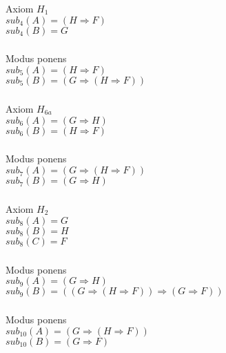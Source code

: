 \documentclass[10pt,a4paper,oneside,ngerman,numbers=noenddot]{scrartcl}
\begin{document}
\subsubsection{} %
Axiom $H_{1}$ \\
$sub_{4}(A) = (H \Rightarrow F)$\\
$sub_{4}(B) = G$
\subsubsection{} %
Modus ponens\\
$sub_{5}(A) = (H \Rightarrow F)$\\
$sub_{5}(B) = (G \Rightarrow (H \Rightarrow F))$
\subsubsection{} %
Axiom $H_{6a}$\\
$sub_{6}(A) = (G \Rightarrow H)$\\
$sub_{6}(B) = (H \Rightarrow F)$
\subsubsection{} %
Modus ponens\\
$sub_{7}(A) = (G \Rightarrow (H \Rightarrow F))$ \\
$sub_{7}(B) = (G \Rightarrow H)$
\subsubsection{} %
Axiom $H_{2}$\\
$sub_{8}(A) = G$\\
$sub_{8}(B) = H$\\
$sub_{8}(C) = F$
\subsubsection{} %
Modus ponens\\
$sub_{9}(A) = (G \Rightarrow H)$\\
$sub_{9}(B) = ((G \Rightarrow (H \Rightarrow F)) \Rightarrow (G \Rightarrow F))$
\subsubsection{} %
Modus ponens\\
$sub_{10}(A) = (G \Rightarrow (H \Rightarrow F))$\\
$sub_{10}(B) = (G \Rightarrow F)$
\end{document}
